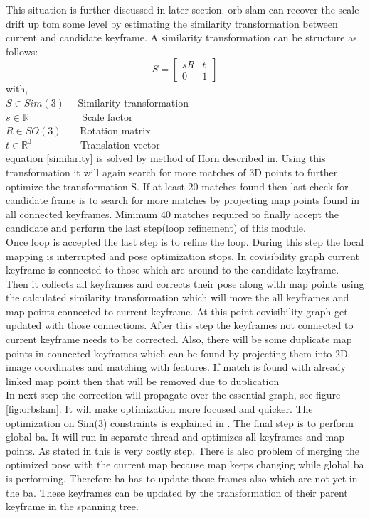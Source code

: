 This situation is further discussed in later section. \acrshort{orb} \acrshort{slam} can recover the scale drift up tom some level by estimating the similarity transformation between current and candidate keyframe. A similarity transformation can be structure as follows:
\begin{equation*}
S = 
\begin{bmatrix}
sR & t \\
0 & 1
\end{bmatrix}
\label{similarity}
\end{equation*} 
with,\\
$ S \in Sim(3)$  \ \ Similarity transformation \\
$ s \in \mathbb{R}$ \ \ \ \ \ \ \ \ \ \ Scale factor \\
$ R \in SO(3) $  \ \ \   Rotation matrix \\
$ t \in \mathbb{R^{3}} $ \ \ \ \ \ \ \ \ \ Translation vector\\
\newline
equation \ref{similarity} is solved by method of Horn described in. Using this transformation it will again search for more matches of 3D points to further optimize the transformation S. If at least 20 matches found then last check for candidate frame is to search for more matches by projecting map points found in all connected keyframes. Minimum 40 matches required to finally accept the candidate and perform the last step(loop refinement) of this module. \\
\newline 
Once loop is accepted the last step is to refine the loop. During this step the local mapping is interrupted and pose optimization stops. In covisibility graph current keyframe is connected to those which are around to the candidate keyframe. Then it collects all keyframes and corrects their pose along with map points using the calculated similarity transformation which will move the all keyframes and map points connected to current keyframe. At this point covisibility graph get updated with those connections. After this step the keyframes not connected to current keyframe needs to be corrected. Also, there will be some duplicate map points in connected keyframes which can be found by projecting them into 2D image coordinates and matching with features. If match is found with already linked map point then that will be removed due to duplication \\
\newline 
In next step the correction will propagate over the essential graph, see figure \ref{fig:orbslam}. It will make optimization more focused and quicker. The optimization on Sim(3) constraints is explained in \cite{Mur-Artal}. The final step is to perform global \acrshort{ba}. It will run in separate thread and optimizes all keyframes and map points. As stated in \cite{Mur-Artal} this is very costly step. There is also problem of merging the optimized pose with the current map because map keeps changing while global \acrshort{ba} is performing. Therefore \acrshort{ba} has to update those frames also which are not yet in the \acrshort{ba}. These keyframes can be updated by the transformation of their parent keyframe in the spanning tree.


